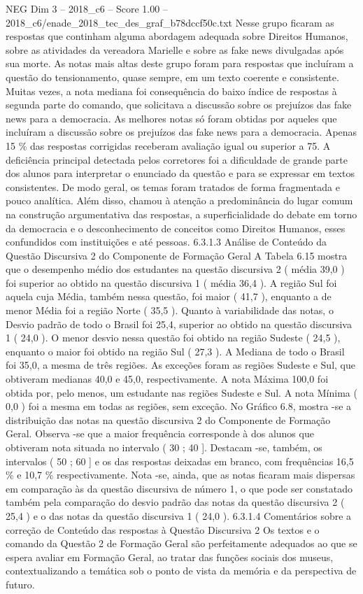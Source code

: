 \begin{textsample}{NEG Dim 3 – 2018\_c6 – Score 1.00 – 2018\_c6/enade\_2018\_tec\_des\_graf\_b78dccf50c.txt}
Nesse grupo ficaram as respostas que continham alguma abordagem adequada sobre Direitos Humanos, sobre as atividades da vereadora Marielle e sobre as fake news divulgadas após sua morte.
As notas mais altas deste grupo foram para respostas que incluíram a questão do tensionamento, quase sempre, em um texto coerente e consistente.
Muitas vezes, a nota mediana foi consequência do baixo índice de respostas à segunda parte do comando, que solicitava a discussão sobre os prejuízos das fake news para a democracia.
As melhores notas só foram obtidas por aqueles que incluíram a discussão sobre os prejuízos das fake news para a democracia.
Apenas 15 \% das respostas corrigidas receberam avaliação igual ou superior a 75.
A deficiência principal detectada pelos corretores foi a dificuldade de grande parte dos alunos para interpretar o enunciado da questão e para se expressar em textos consistentes.
De modo geral, os temas foram tratados de forma fragmentada e pouco analítica.
Além disso, chamou à atenção a predominância do lugar comum na construção argumentativa das respostas, a superficialidade do debate em torno da democracia e o desconhecimento de conceitos como Direitos Humanos, esses confundidos com instituições e até pessoas. 6.3.1.3 Análise de Conteúdo da Questão Discursiva 2 do Componente de Formação Geral A Tabela 6.15 mostra que o desempenho médio dos estudantes na questão discursiva 2 ( média 39,0 ) foi superior ao obtido na questão discursiva 1 ( média 36,4 ).
A região Sul foi aquela cuja Média, também nessa questão, foi maior ( 41,7 ), enquanto a de menor Média foi a região Norte ( 35,5 ).
Quanto à variabilidade das notas, o Desvio padrão de todo o Brasil foi 25,4, superior ao obtido na questão discursiva 1 ( 24,0 ).
O menor desvio nessa questão foi obtido na região Sudeste ( 24,5 ), enquanto o maior foi obtido na região Sul ( 27,3 ).
A Mediana de todo o Brasil foi 35,0, a mesma de três regiões.
As exceções foram as regiões Sudeste e Sul, que obtiveram medianas 40,0 e 45,0, respectivamente.
A nota Máxima 100,0 foi obtida por, pelo menos, um estudante nas regiões Sudeste e Sul.
A nota Mínima ( 0,0 ) foi a mesma em todas as regiões, sem exceção.
No Gráfico 6.8, mostra -se a distribuição das notas na questão discursiva 2 do Componente de Formação Geral.
Observa -se que a maior frequência corresponde à dos alunos que obtiveram nota situada no intervalo ( 30 ; 40 ].
Destacam -se, também, os intervalos ( 50 ; 60 ] e os das respostas deixadas em branco, com frequências 16,5 \% e 10,7 \% respectivamente.
Nota -se, ainda, que as notas ficaram mais dispersas em comparação às da questão discursiva de número 1, o que pode ser constatado também pela comparação do desvio padrão das notas da questão discursiva 2 ( 25,4 ) e o das notas da questão discursiva 1 ( 24,0 ). 6.3.1.4 Comentários sobre a correção de Conteúdo das respostas à Questão Discursiva 2 Os textos e o comando da Questão 2 de Formação Geral são perfeitamente adequados ao que se espera avaliar em Formação Geral, ao tratar das funções sociais dos museus, contextualizando a temática sob o ponto de vista da memória e da perspectiva de futuro.

\end{textsample}
